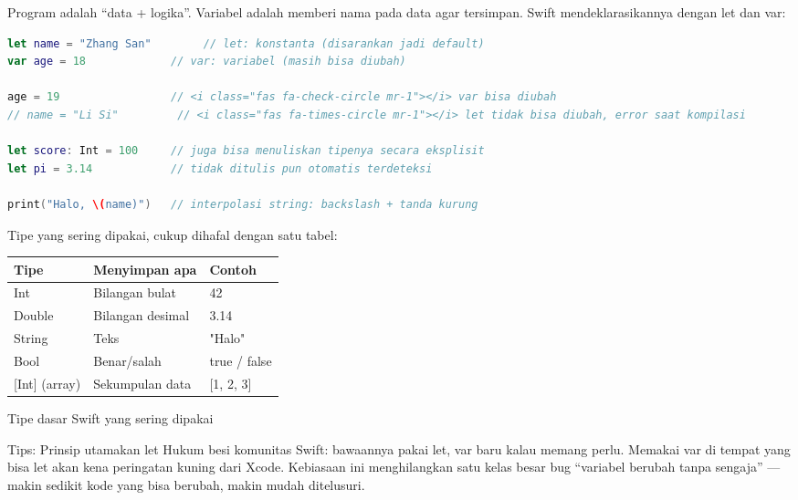 


Program adalah “data + logika”. Variabel adalah memberi nama pada data agar tersimpan. Swift mendeklarasikannya dengan let dan var:

\begin{lstlisting}[language=Swift]
let name = "Zhang San"        // let: konstanta (disarankan jadi default)
var age = 18             // var: variabel (masih bisa diubah)

age = 19                 // <i class="fas fa-check-circle mr-1"></i> var bisa diubah
// name = "Li Si"         // <i class="fas fa-times-circle mr-1"></i> let tidak bisa diubah, error saat kompilasi

let score: Int = 100     // juga bisa menuliskan tipenya secara eksplisit
let pi = 3.14            // tidak ditulis pun otomatis terdeteksi

print("Halo, \(name)")   // interpolasi string: backslash + tanda kurung
\end{lstlisting}

Tipe yang sering dipakai, cukup dihafal dengan satu tabel:

\begin{center}
\begin{tabularx}{\linewidth}{|X|X|X|}
\hline
\textbf{Tipe} & \textbf{Menyimpan apa} & \textbf{Contoh} \tabularnewline
\hline
Int & Bilangan bulat & 42 \tabularnewline
Double & Bilangan desimal & 3.14 \tabularnewline
String & Teks & "Halo" \tabularnewline
Bool & Benar/salah & true / false \tabularnewline
{}[Int] (array) & Sekumpulan data & {}[1, 2, 3] \tabularnewline
\hline
\end{tabularx}
\end{center}

\begin{center}\small\color{gray}Tipe dasar Swift yang sering dipakai\end{center}

\begin{tcbinfo}{Tips: Prinsip utamakan let}
Hukum besi komunitas Swift: bawaannya pakai let, var baru kalau memang perlu. Memakai var di tempat yang bisa let akan kena peringatan kuning dari Xcode. Kebiasaan ini menghilangkan satu kelas besar bug “variabel berubah tanpa sengaja” — makin sedikit kode yang bisa berubah, makin mudah ditelusuri.

\end{tcbinfo}

